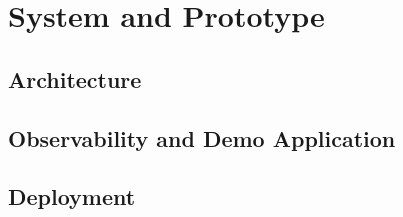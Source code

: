 \chapter{System and Prototype}
\label{ch:system}


\section{Architecture}
\label{sec:sys-architecture}

\section{Observability and Demo Application}
\label{sec:sys-app}

\section{Deployment}
\label{sec:sys-deploy}
